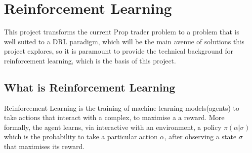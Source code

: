 \documentclass[ %
                    author={Ashwinder Khurana},
                supervisor={Prof Dave Cliff},
                    degree={MEng},
                     title={The Deeply Reinforced Trader},
                  subtitle={},
                      type={enterprise},
                      year={2020} ]{dissertation}
\begin{document}
\section{Reinforcement Learning}

This project transforms the current Prop trader problem to a problem that is well suited to a DRL paradigm, which will be the main avenue of solutions this project explores, so it is paramount to provide the technical background for reinforcement learning, which is the basis of this project.
\subsection{What is Reinforcement Learning}
Reinforcement Learning is the training of machine learning models(agents) to take actions that interact with a complex, to maximise a a reward. More formally, the agent learns, via interactive with an environment, a policy $\pi(\alpha|\sigma)$ which is the probability to take a particular action $\alpha$, after observing a state $\sigma$ that maximises its reward. 
\\
\\
\end{document}
